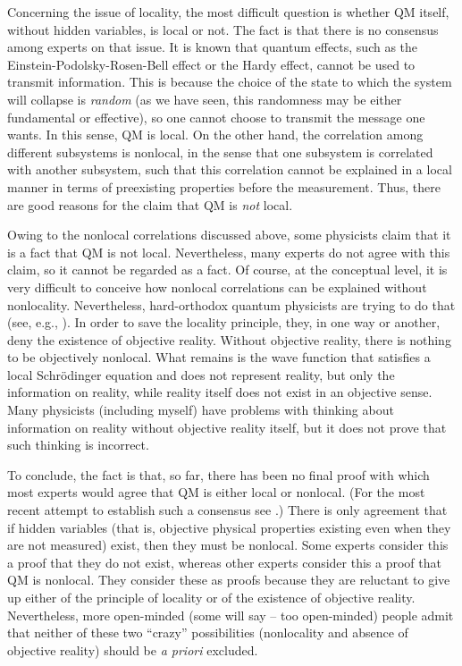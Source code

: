 \documentclass[12pt]{article}
\begin{document}
Concerning the issue of locality, the most difficult question is 
whether QM itself, without hidden variables, is local or not.
The fact is that there is no consensus among experts on that issue.
It is known that quantum effects, such as the Einstein-Podolsky-Rosen-Bell
effect or the Hardy effect, cannot be used to transmit information. 
This is because the choice of the state to which the system 
will collapse is {\em random} (as we have seen, this randomness may
be either fundamental or effective), so one cannot choose to 
transmit the message one wants. In this sense, QM is local.
On the other hand, 
the correlation among different subsystems is nonlocal, in the sense that
one subsystem is correlated with another subsystem, such that this correlation 
cannot be explained in a local manner in terms of preexisting properties
before the measurement.
Thus, there are good reasons for the claim that QM is {\em not} local.

Owing to the nonlocal correlations discussed above, some physicists 
claim that it is a fact that QM is not local. Nevertheless, 
many experts do not agree with this claim, 
so it cannot be regarded as a fact.
Of course, at the conceptual level, it is very difficult 
to conceive how nonlocal correlations can be explained without nonlocality.
Nevertheless, hard-orthodox quantum physicists are trying to do that
(see, e.g., \cite{zeil,rov1,rov2,mermcor}).
In order to save the locality principle, they, 
in one way or another, deny the existence 
of objective reality. Without objective reality, 
there is nothing to be objectively nonlocal.
What remains is the wave function that satisfies a local 
Schr\"odinger equation and does not represent reality, but only 
the information on reality, while reality itself
does not exist in an objective sense. 
Many physicists (including myself) have problems with thinking 
about information on reality without objective reality itself,
but it does not prove that such thinking is incorrect. 

To conclude, the fact is that, so far, there has been no final proof 
with which most experts would agree that QM is either local or 
nonlocal. (For the most recent attempt to establish such a 
consensus see \cite{niknonloc}.) 
There is only agreement that if hidden variables 
(that is, objective physical properties existing even when 
they are not measured) exist, then they must be nonlocal.
Some experts consider this a proof that they do not exist, whereas  
other experts consider this a proof that QM is nonlocal.
They consider these as proofs
because they are reluctant to give up either 
of the principle of locality or of the existence of objective reality. 
Nevertheless, more open-minded (some will say -- too open-minded) 
people admit that neither of these two ``crazy'' possibilities 
(nonlocality and absence of objective reality) should be 
{\em a priori} excluded.  
 
\end{document}
